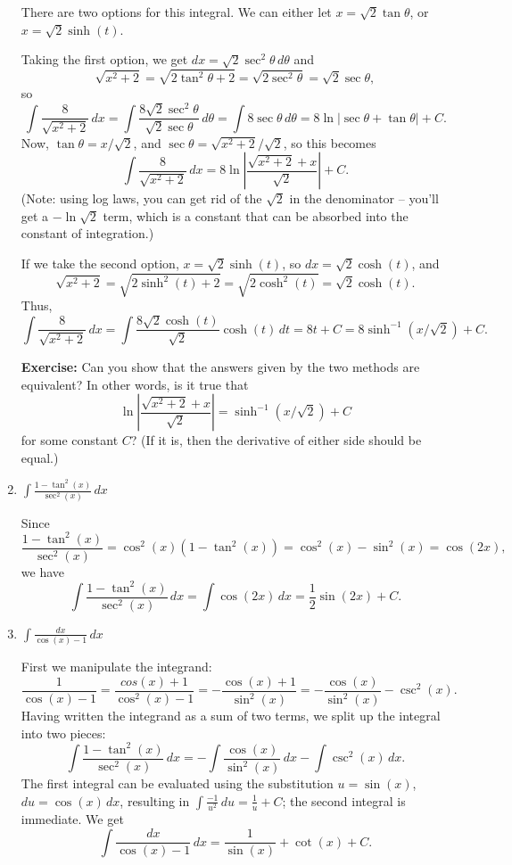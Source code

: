 \documentclass[12pt]{article}
\newcommand{\di}{\displaystyle}
\newcommand{\abs}[1]{\lvert #1\rvert}
\begin{document}
\begin{enumerate}
 There are two options for this integral. We can either let $x=\sqrt{2}\tan\theta$, or $x=\sqrt{2}\sinh(t)$.
 
 Taking the first option, we get $dx = \sqrt{2}\sec^2\theta\,d\theta$ and 
 \[
 \sqrt{x^2+2} = \sqrt{2\tan^2\theta+2} = \sqrt{2\sec^2\theta} = \sqrt{2}\sec\theta,
 \]
 so
 \[
 \int\frac{8}{\sqrt{x^2+2}}\,dx = \int \frac{8\sqrt{2}\sec^2\theta}{\sqrt{2}\sec\theta}\,d\theta = \int 8\sec\theta\,d\theta = 8\ln\abs{\sec\theta+\tan\theta}+C.
 \]
 Now, $\tan\theta = x/\sqrt{2}$, and $\sec\theta = \sqrt{x^2+2}/\sqrt{2}$, so this becomes
 \[
 \int\frac{8}{\sqrt{x^2+2}}\,dx = 8\ln\left\lvert \frac{\sqrt{x^2+2}+x}{\sqrt{2}}\right\rvert+C.
 \]
 (Note: using log laws, you can get rid of the $\sqrt{2}$ in the denominator --  you'll get a $-\ln\sqrt{2}$ term, which is a constant that can be absorbed into the constant of integration.)
 
 \bigskip
 
 If we take the second option, $x=\sqrt{2}\sinh(t)$, so $dx = \sqrt{2}\cosh(t)$, and 
 \[
 \sqrt{x^2+2} = \sqrt{2\sinh^2(t)+2} = \sqrt{2\cosh^2(t)} = \sqrt{2}\cosh(t).
 \]
 Thus,
 \[
 \int \frac{8}{\sqrt{x^2+2}}\,dx = \int \frac{8\sqrt{2}\cosh(t)}{\sqrt{2}}\cosh(t)\,dt = 8t+C = 8\sinh^{-1}(x/\sqrt{2})+C.
 \]
 
{\bf Exercise:} Can you show that the answers given by the two methods are equivalent? In other words, is it true that
\[
 \ln\left\lvert \frac{\sqrt{x^2+2}+x}{\sqrt{2}}\right\rvert=\sinh^{-1}(x/\sqrt{2})+C
\]
for some constant $C$? (If it is, then the derivative of either side should be equal.)

 \item $\di \int \frac{1-\tan^2(x)}{\sec^2(x)}\,dx$
 
 Since
 \[
 \frac{1-\tan^2(x)}{\sec^2(x)} = \cos^2(x)(1-\tan^2(x))=\cos^2(x)-\sin^2(x)=\cos(2x),
 \]
 we have
 \[
 \int \frac{1-\tan^2(x)}{\sec^2(x)}\,dx = \int \cos(2x)\,dx = \frac{1}{2}\sin(2x)+C.
 \]
 
 \item $\di \int \frac{dx}{\cos(x)-1}\,dx$
 
 First we manipulate the integrand:
 \[
 \frac{1}{\cos(x)-1} = \frac{cos(x)+1}{\cos^2(x)-1} = -\frac{\cos(x)+1}{\sin^2(x)} = -\frac{\cos(x)}{\sin^2(x)}-\csc^2(x).
 \]
 Having written the integrand as a sum of two terms, we split up the integral into two pieces:
 \[
 \int \frac{1-\tan^2(x)}{\sec^2(x)}\,dx = -\int\frac{\cos(x)}{\sin^2(x)}\,dx - \int\csc^2(x)\,dx.
 \]
 The first integral can be evaluated using the substitution $u=\sin(x)$, $du = \cos(x)\,dx$, resulting in $\int\frac{-1}{u^2}\,du = \frac{1}{u}+C$; the second integral is immediate. We get
 \[
 \int \frac{dx}{\cos(x)-1}\,dx = \frac{1}{\sin(x)}+\cot(x)+C.
 \]
\end{enumerate}  
\end{document}
